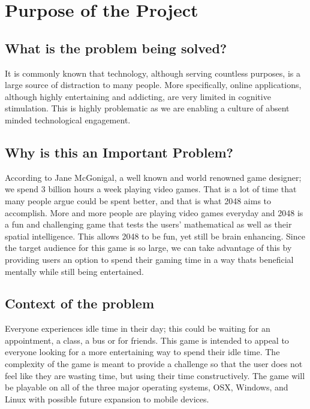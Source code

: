 \newpage
\tableofcontents
\newpage

\section{Purpose of the Project}
\subsection{What is the problem being solved?} 
\par\indent\indent It is commonly known that technology, although serving countless purposes, is a large source of distraction to many people. More specifically, online applications, although highly entertaining and addicting, 
are very limited in cognitive stimulation. This is highly problematic as we are enabling a culture of absent minded technological engagement.
\subsection{Why is this an Important Problem?} 
\par\indent\indent According to Jane McGonigal, a well known and world renowned game designer; we spend 3 
billion hours a week playing video games. That is a lot of time that many people argue could be spent better, and 
that is what 2048 aims to accomplish. More and more people are playing video games everyday and 2048 is a 
fun and challenging game that tests the users' mathematical as well as their spatial intelligence. This allows 2048 
to be fun, yet still be brain enhancing. Since the target audience for this game is so large, we can take advantage 
of this by providing users an option to spend their gaming time in a way thats beneficial mentally while still being 
entertained.
\subsection{Context of the problem} 
\par\indent\indent Everyone experiences idle time in their day; this could be waiting for an appointment, a class, a 
bus or for friends. This game is intended to appeal to everyone looking for a more entertaining way to spend their 
idle time. The complexity of the game is meant to provide a challenge so that the user does not feel like they are 
wasting time, but using their time constructively. The game will be playable on all of the three major operating 
systems, OSX, Windows, and Linux with possible future expansion to mobile devices.

